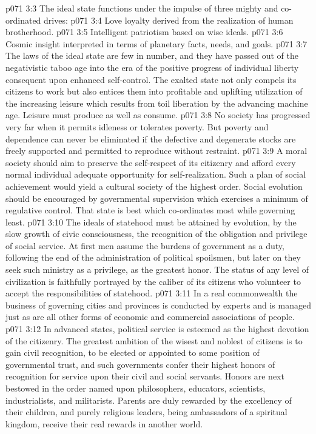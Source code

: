 \vs p071 3:3 \pc The ideal state functions under the impulse of three mighty and co\hyp{}ordinated drives:
\vs p071 3:4 \bibnobreakspace Love loyalty derived from the realization of human brotherhood.
\vs p071 3:5 \bibnobreakspace Intelligent patriotism based on wise ideals.
\vs p071 3:6 \bibnobreakspace Cosmic insight interpreted in terms of planetary facts, needs, and goals.
\vs p071 3:7 \pc The laws of the ideal state are few in number, and they have passed out of the negativistic taboo age into the era of the positive progress of individual liberty consequent upon enhanced self\hyp{}control. The exalted state not only compels its citizens to work but also entices them into profitable and uplifting utilization of the increasing leisure which results from toil liberation by the advancing machine age. Leisure must produce as well as consume.
\vs p071 3:8 No society has progressed very far when it permits idleness or tolerates poverty. But poverty and dependence can never be eliminated if the defective and degenerate stocks are freely supported and permitted to reproduce without restraint.
\vs p071 3:9 A moral society should aim to preserve the self\hyp{}respect of its citizenry and afford every normal individual adequate opportunity for self\hyp{}realization. Such a plan of social achievement would yield a cultural society of the highest order. Social evolution should be encouraged by governmental supervision which exercises a minimum of regulative control. That state is best which co\hyp{}ordinates most while governing least.
\vs p071 3:10 The ideals of statehood must be attained by evolution, by the slow growth of civic consciousness, the recognition of the obligation and privilege of social service. At first men assume the burdens of government as a duty, following the end of the administration of political spoilsmen, but later on they seek such ministry as a privilege, as the greatest honor. The status of any level of civilization is faithfully portrayed by the caliber of its citizens who volunteer to accept the responsibilities of statehood.
\vs p071 3:11 In a real commonwealth the business of governing cities and provinces is conducted by experts and is managed just as are all other forms of economic and commercial associations of people.
\vs p071 3:12 In advanced states, political service is esteemed as the highest devotion of the citizenry. The greatest ambition of the wisest and noblest of citizens is to gain civil recognition, to be elected or appointed to some position of governmental trust, and such governments confer their highest honors of recognition for service upon their civil and social servants. Honors are next bestowed in the order named upon philosophers, educators, scientists, industrialists, and militarists. Parents are duly rewarded by the excellency of their children, and purely religious leaders, being ambassadors of a spiritual kingdom, receive their real rewards in another world.
